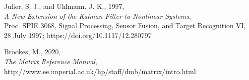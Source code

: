 \begin{thebibliography}{9}
Julier, S. J., and Uhlmann, J. K., 1997, \\
\emph{A New Extension of the Kalman Filter to Nonlinear Systems}, \\
Proc. SPIE 3068, Signal Processing, Sensor Fusion, and Target Recognition VI, 28 July 1997; https://doi.org/10.1117/12.280797

Brookes, M., 2020, \\
\emph{The Matrix Reference Manual}, \\
http://www.ee.imperial.ac.uk/hp/staff/dmb/matrix/intro.html

\end{thebibliography}
